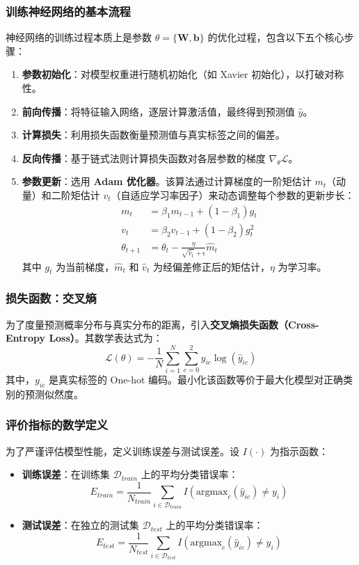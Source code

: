 \subsubsection{训练神经网络的基本流程}
神经网络的训练过程本质上是参数 $\theta = \{\mathbf{W}, \mathbf{b}\}$ 的优化过程，包含以下五个核心步骤：
\begin{enumerate}
	\item \textbf{参数初始化}：对模型权重进行随机初始化（如 Xavier 初始化），以打破对称性。
	\item \textbf{前向传播}：将特征输入网络，逐层计算激活值，最终得到预测值 $\hat{y}$。
	\item \textbf{计算损失}：利用损失函数衡量预测值与真实标签之间的偏差。
	\item \textbf{反向传播}：基于链式法则计算损失函数对各层参数的梯度 $\nabla_{\theta} \mathcal{L}$。
\item \textbf{参数更新}：选用 \textbf{Adam 优化器}。该算法通过计算梯度的一阶矩估计 $m_t$（动量）和二阶矩估计 $v_t$（自适应学习率因子）来动态调整每个参数的更新步长：
\begin{align*}
	m_t &= \beta_1 m_{t-1} + (1 - \beta_1) g_t \\
	v_t &= \beta_2 v_{t-1} + (1 - \beta_2) g_t^2 \\
	\theta_{t+1} &= \theta_t - \frac{\eta}{\sqrt{\hat{v}_t} + \epsilon} \hat{m}_t
\end{align*}
其中 $g_t$ 为当前梯度，$\hat{m}_t$ 和 $\hat{v}_t$ 为经偏差修正后的矩估计，$\eta$ 为学习率。
\end{enumerate}

\subsubsection{损失函数：交叉熵}
为了度量预测概率分布与真实分布的距离，引入\textbf{交叉熵损失函数（Cross-Entropy Loss）}。其数学表达式为：
$$ \mathcal{L}(\theta) = -\frac{1}{N} \sum_{i=1}^{N} \sum_{c=0}^{2} y_{ic} \log(\hat{y}_{ic}) $$
其中，$y_{ic}$ 是真实标签的 One-hot 编码。最小化该函数等价于最大化模型对正确类别的预测似然度。

\subsubsection{评价指标的数学定义}
为了严谨评估模型性能，定义训练误差与测试误差。设 $I(\cdot)$ 为指示函数：
\begin{itemize}
	\item \textbf{训练误差}：在训练集 $\mathcal{D}_{train}$ 上的平均分类错误率：
	$$ E_{train} = \frac{1}{N_{train}} \sum_{i \in \mathcal{D}_{train}} I\left(\text{argmax}_c(\hat{y}_{ic}) \neq y_i\right) $$
	\item \textbf{测试误差}：在独立的测试集 $\mathcal{D}_{test}$ 上的平均分类错误率：
	$$ E_{test} = \frac{1}{N_{test}} \sum_{i \in \mathcal{D}_{test}} I\left(\text{argmax}_c(\hat{y}_{ic}) \neq y_i\right) $$
\end{itemize}

